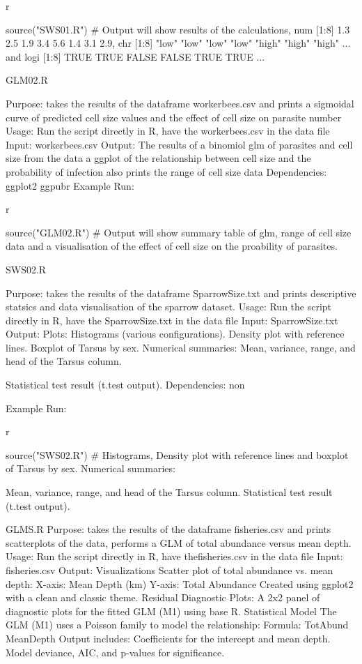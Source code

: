     r

    source("SWS01.R")
    # Output will show results of the calculations, num [1:8] 1.3 2.5 1.9 3.4 5.6 1.4 3.1 2.9, chr [1:8] "low" "low" "low" "low" "high" "high" "high" ... and logi [1:8] TRUE TRUE FALSE FALSE TRUE TRUE ...

GLM02.R

    Purpose: takes the results of the dataframe workerbees.csv and prints a sigmoidal curve of predicted cell size values and the effect of cell size on parasite number
    Usage: Run the script directly in R, have the workerbees.csv in the data file 
    Input: workerbees.csv
    Output: The results of a binomiol glm of parasites and cell size from the data 
    a ggplot of the relationship between cell size and the probability of infection
    also prints the range of cell size data
    Dependencies: 
    ggplot2
    ggpubr
    Example Run:

    r

    source("GLM02.R")
    # Output will show summary table of glm, range of cell size data and a visualisation of the effect of cell size on the proability of parasites. 

SWS02.R

    Purpose: takes the results of the dataframe SparrowSize.txt and prints descriptive statsics and data visualisation of the sparrow dataset.
    Usage: Run the script directly in R, have the SparrowSize.txt in the data file 
    Input:  SparrowSize.txt 
    Output: 
    Plots:
    Histograms (various configurations).
    Density plot with reference lines.
    Boxplot of Tarsus by sex.
    Numerical summaries:
    Mean, variance, range, and head of the Tarsus column.

Statistical test result (t.test output).  
  Dependencies: non

    Example Run:

    r

    source("SWS02.R")
    #  Histograms, Density plot with reference lines and boxplot of Tarsus by sex.
    Numerical summaries:

    Mean, variance, range, and head of the Tarsus column.
    Statistical test result (t.test output).

GLMS.R
 Purpose: takes the results of the dataframe fisheries.csv and prints scatterplots of the data, performs a GLM of total abundance versus mean depth. 
    Usage: Run the script directly in R, have thefisheries.csv in the data file 
    Input:  fisheries.csv
    Output: 
    Visualizations
    Scatter plot of total abundance vs. mean depth: 
        X-axis: Mean Depth (km) 
        Y-axis: Total Abundance 
        Created using ggplot2 with a clean and classic theme. 
    Residual Diagnostic Plots: 
        A 2x2 panel of diagnostic plots for the fitted GLM (M1) using base R. 
    Statistical Model 
    The GLM (M1) uses a Poisson family to model the relationship:
        Formula: TotAbund ~ MeanDepth
        Output includes:
            Coefficients for the intercept and mean depth.
            Model deviance, AIC, and p-values for significance.
     
